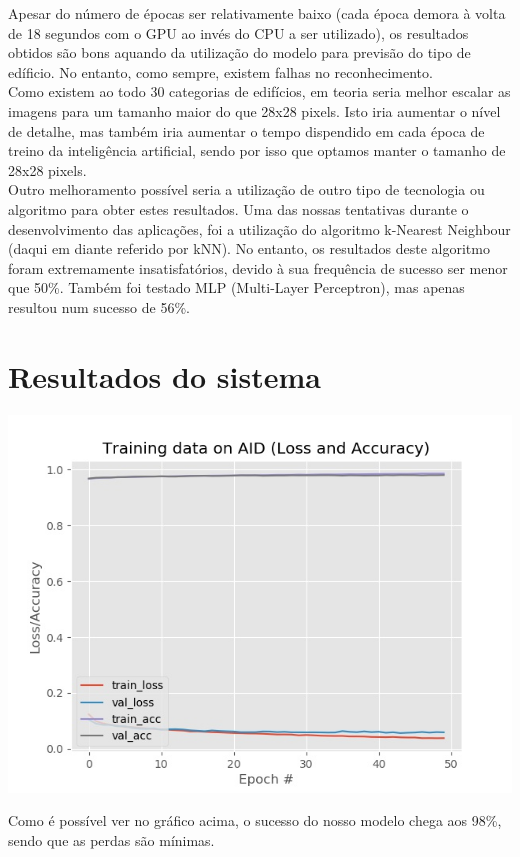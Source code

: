 \documentclass[extendedabs]{vcom}
\begin{document}
Apesar do número de épocas ser relativamente baixo (cada época demora à volta de 18 segundos com o GPU ao invés do CPU a ser utilizado), os resultados obtidos são bons aquando da utilização do modelo para previsão do tipo de edíficio. No entanto, como sempre, existem falhas no reconhecimento. \\
Como existem ao todo 30 categorias de edifícios, em teoria seria melhor escalar as imagens para um tamanho maior do que 28x28 pixels. Isto iria aumentar o nível de detalhe, mas também iria aumentar o tempo dispendido em cada época de treino da inteligência artificial, sendo por isso que optamos manter o tamanho de 28x28 pixels. \\
Outro melhoramento possível seria a utilização de outro tipo de tecnologia ou algoritmo para obter estes resultados. Uma das nossas tentativas durante o desenvolvimento das aplicações, foi a utilização do algoritmo k-Nearest Neighbour (daqui em diante referido por kNN). No entanto, os resultados deste algoritmo foram extremamente insatisfatórios, devido à sua frequência de sucesso ser menor que 50\%. Também foi testado MLP (Multi-Layer Perceptron), mas apenas resultou num sucesso de 56\%.

\section{Resultados do sistema}
\includegraphics[scale=0.3]{ModelTrain.jpg}

Como é possível ver no gráfico acima, o sucesso do nosso modelo chega aos 98\%, sendo que as perdas são mínimas.
\end{document}
